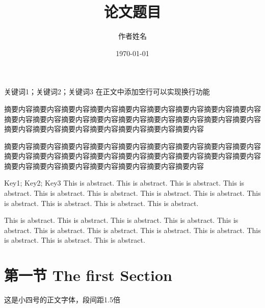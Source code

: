 \documentclass{HustGraduPaper}
\title{论文题目} %
\author{作者姓名} %
\date{\today} %
\begin{document}
	\maketitle
	
	
	\clearpage %
	
	\begin{cnabstract}{关键词1；关键词2；关键词3}
		在正文中添加空行可以实现换行功能
		
		摘要内容摘要内容摘要内容摘要内容摘要内容摘要内容摘要内容摘要内容摘要内容摘要内容摘要内容摘要内容摘要内容摘要内容摘要内容摘要内容摘要内容摘要内容摘要内容摘要内容摘要内容摘要内容摘要内容摘要内容摘要内容
		
		摘要内容摘要内容摘要内容摘要内容摘要内容摘要内容摘要内容摘要内容摘要内容摘要内容摘要内容摘要内容摘要内容摘要内容摘要内容摘要内容摘要内容摘要内容摘要内容摘要内容摘要内容摘要内容摘要内容摘要内容摘要内容
	\end{cnabstract}
	\begin{enabstract}{Key1; Key2; Key3}
		This is abstract. This is abstract. This is abstract. This is abstract. This is abstract. This is abstract. This is abstract. This is abstract. This is abstract. This is abstract. This is abstract. This is abstract. 
		
		This is abstract. This is abstract. This is abstract. This is abstract. This is abstract. This is abstract. This is abstract. This is abstract. This is abstract. This is abstract. This is abstract. This is abstract. 
	\end{enabstract}
	
	\maketoc
	
	\clearpage%
	
	\section{第一节 The first Section}
	这是小四号的正文字体，段间距1.5倍
	
\end{document}
